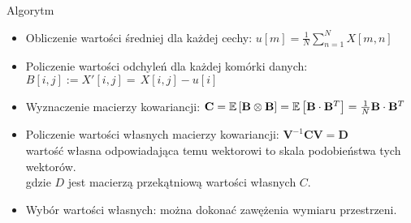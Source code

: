\documentclass[a4paper]{beamer}
\begin{document}
\begin{frame}
\begin{block}{Algorytm}
\begin{itemize}
\item Obliczenie wartości średniej dla każdej cechy: $u[m]=\frac{1}{N} \sum\limits_{n=1}^N X[m,n]$
\item Policzenie wartości odchyleń dla każdej komórki danych: $B[i,j] := X'[i,j] =\frac{}{} X[i,j]-u[i]$
\item Wyznaczenie macierzy kowariancji: $\mathbf{C} = \mathbb{ E } \left[ \mathbf{B} \otimes \mathbf{B} \right] = \mathbb{ E } \left[ \mathbf{B} \cdot \mathbf{B}^{T} \right] = { 1 \over N } \mathbf{B} \cdot \mathbf{B}^{T}$
\item Policzenie wartości własnych macierzy kowariancji: $\mathbf{V}^{-1} \mathbf{C} \mathbf{V} = \mathbf{D} $ \\
{\footnotesize wartość własna odpowiadająca temu wektorowi to skala podobieństwa tych wektorów.}\\
gdzie $D$ jest macierzą przekątniową wartości własnych $C$.
\item Wybór wartości własnych: można dokonać zawężenia wymiaru przestrzeni.
\end{itemize}
\end{block}
\end{frame}
\end{document}
